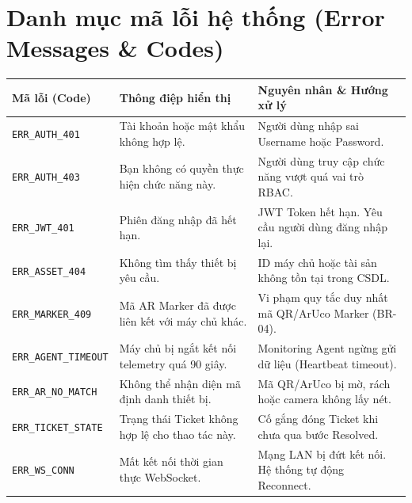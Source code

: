 \section{Danh mục mã lỗi hệ thống (Error Messages \& Codes)}
\begin{longtable}{|p{3cm}|p{4.5cm}|p{7cm}|}
\hline
\textbf{Mã lỗi (Code)} & \textbf{Thông điệp hiển thị} & \textbf{Nguyên nhân \& Hướng xử lý} \\ \hline
\endhead
\texttt{ERR\_AUTH\_401} & Tài khoản hoặc mật khẩu không hợp lệ. & Người dùng nhập sai Username hoặc Password. \\ \hline
\texttt{ERR\_AUTH\_403} & Bạn không có quyền thực hiện chức năng này. & Người dùng truy cập chức năng vượt quá vai trò RBAC. \\ \hline
\texttt{ERR\_JWT\_401} & Phiên đăng nhập đã hết hạn. & JWT Token hết hạn. Yêu cầu người dùng đăng nhập lại. \\ \hline
\texttt{ERR\_ASSET\_404} & Không tìm thấy thiết bị yêu cầu. & ID máy chủ hoặc tài sản không tồn tại trong CSDL. \\ \hline
\texttt{ERR\_MARKER\_409} & Mã AR Marker đã được liên kết với máy chủ khác. & Vi phạm quy tắc duy nhất mã QR/ArUco Marker (BR-04). \\ \hline
\texttt{ERR\_AGENT\_TIMEOUT} & Máy chủ bị ngắt kết nối telemetry quá 90 giây. & Monitoring Agent ngừng gửi dữ liệu (Heartbeat timeout). \\ \hline
\texttt{ERR\_AR\_NO\_MATCH} & Không thể nhận diện mã định danh thiết bị. & Mã QR/ArUco bị mờ, rách hoặc camera không lấy nét. \\ \hline
\texttt{ERR\_TICKET\_STATE} & Trạng thái Ticket không hợp lệ cho thao tác này. & Cố gắng đóng Ticket khi chưa qua bước Resolved. \\ \hline
\texttt{ERR\_WS\_CONN} & Mất kết nối thời gian thực WebSocket. & Mạng LAN bị đứt kết nối. Hệ thống tự động Reconnect. \\ \hline
\end{longtable}

